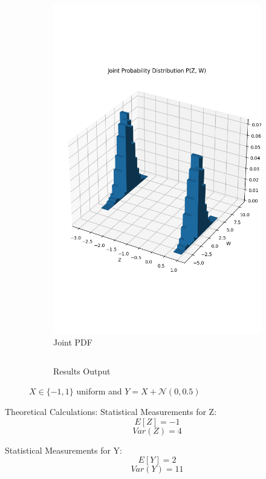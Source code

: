\documentclass{article}
\begin{document}
\begin{figure}[H]
\begin{subfigure}{0.45\textwidth}
    \includegraphics[width=\linewidth]{results/section3/e(2).png}
    \caption{Joint PDF}
  \end{subfigure}
  \begin{subfigure}{\textwidth}
    \centering
    \inputminted{text}{results/section3/e.txt}
    \caption{Results Output}
  \end{subfigure}
  \caption{$X \in \{-1,1\}$ uniform and $Y = X + \mathcal{N}(0, 0.5)$}
\end{figure}
Theoretical Calculations:
Statistical Measurements for Z:
$$E[Z] = -1$$
$$Var(Z) = 4$$

Statistical Measurements for Y:
$$E[Y] = 2$$
$$Var(Y) = 11$$

\newpage
\end{document}
